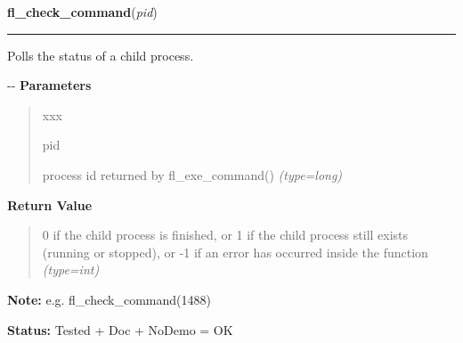 \hspace{.8\funcindent}\begin{boxedminipage}{\funcwidth}

    \raggedright \textbf{fl\_check\_command}(\textit{pid})

    \vspace{-1.5ex}

    \rule{\textwidth}{0.5\fboxrule}
\setlength{\parskip}{2ex}

Polls the status of a child process.

-{}-
\setlength{\parskip}{1ex}
      \textbf{Parameters}
      \vspace{-1ex}

      \begin{quote}
        \begin{Ventry}{xxx}

          \item[pid]


process id returned by fl\_exe\_command()
            {\it (type=long)}

        \end{Ventry}

      \end{quote}

      \textbf{Return Value}
    \vspace{-1ex}

      \begin{quote}

0 if the child process is finished, or 1 if the child process
still exists (running or stopped), or -1 if an error has occurred
inside the function
      {\it (type=int)}

      \end{quote}

\textbf{Note:} 
e.g. fl\_check\_command(1488)


\textbf{Status:} 
Tested + Doc + NoDemo = OK


    \end{boxedminipage}

    \label{xformslib:flgoodies:fl_popen}

    \vspace{0.5ex}

